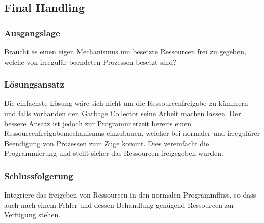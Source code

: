 \subsection{Final Handling}

\subsubsection*{Ausgangslage}

Braucht es einen eigen Mechanismus um besetzte Ressourcen frei zu gegeben, welche von irregulär beendeten Prozessen besetzt sind?

\subsubsection*{Lösungsansatz}

Die einfachste Lösung wäre sich nicht um die Ressourcenfreigabe zu kümmern und falls vorhanden den Garbage Collector seine Arbeit machen lassen. Der bessere Ansatz ist jedoch zur Programmierzeit bereits einen Ressourcenfreigabemechanismus einzubauen, welcher bei normaler und irregulärer Beendigung von Prozessen zum Zuge kommt. Dies vereinfacht die Programmierung und stellt sicher das Ressourcen freigegeben wurden.

\subsubsection*{Schlussfolgerung}

Integriere das freigeben von Ressourcen in den normalen Programmfluss, so dass auch nach einem Fehler und dessen Behandlung genügend Ressourcen zur Verfügung stehen.

